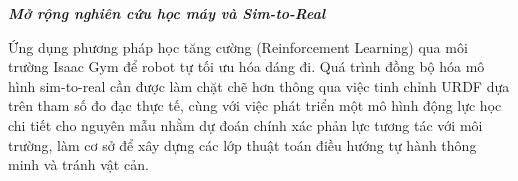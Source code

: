 \textbf{\textit{Mở rộng nghiên cứu học máy và Sim-to-Real}} 

Ứng dụng phương pháp học tăng cường (Reinforcement Learning) qua môi trường Isaac Gym để robot tự tối ưu hóa dáng đi. Quá trình đồng bộ hóa mô hình sim-to-real cần được làm chặt chẽ hơn thông qua việc tinh chỉnh URDF dựa trên tham số đo đạc thực tế, cùng với việc phát triển một mô hình động lực học chi tiết cho nguyên mẫu nhằm dự đoán chính xác phản lực tương tác với môi trường, làm cơ sở để xây dựng các lớp thuật toán điều hướng tự hành thông minh và tránh vật cản.

